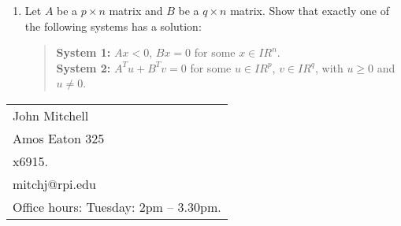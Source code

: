 \documentclass[11pt]{article}
\newcommand{\real}{I\!\! R}
\newcommand{\re}{I\!\! R}
\begin{document}
\begin{enumerate}
             
  \item
Let $A$ be a $p \times n$ matrix and $B$ be a $q \times n$ matrix.
Show that exactly one of the following systems has a solution:
\begin{quote}
{\bf System 1:} $Ax < 0$, $Bx=0$ for some $x \in \re^n$.  \\
{\bf System 2:} $A^Tu+B^Tv=0$ for some $u \in \re^p$, $v \in \re^q$,
with $u \geq 0$ and $u \neq 0$.
\end{quote}
\end{enumerate}

\bigskip

\bigskip

\vfill

\begin{tabular}{@{\hspace{.5in}}l}
   John Mitchell  \\
   Amos Eaton 325  \\
   x6915.  \\
   mitchj@rpi.edu  \\
   Office hours:  
   Tuesday: 2pm -- 3.30pm.
\end{tabular}
\end{document}

